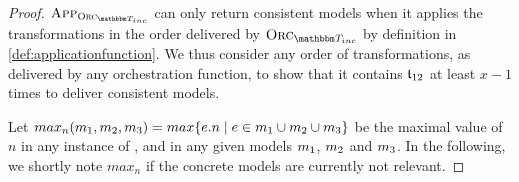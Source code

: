 \begin{proof}
    $\appfunction{\orcfunction{\transformationset{T}_{inc}}}$ can only return consistent models when it applies the transformations in the order delivered by $\orcfunction{\transformationset{T}_{inc}}$ by definition in \autoref{def:applicationfunction}.
    We thus consider any order of transformations, as delivered by any orchestration function, to show that it contains $\mathfrak{t}_{12}$ at least $x-1$ times to deliver consistent models.
    
    Let $max_n(m_{1},m_{2},m_{3}) = max\{ e.n \mid e \in m_{1} \cup m_{2} \cup m_{3} \}$ be the maximal value of $n$ in any instance of ,  and  in any given models $m_{1}$, $m_{2}$ and $m_{3}$. In the following, we shortly note $max_n$ if the concrete models are currently not relevant.


\end{proof}
